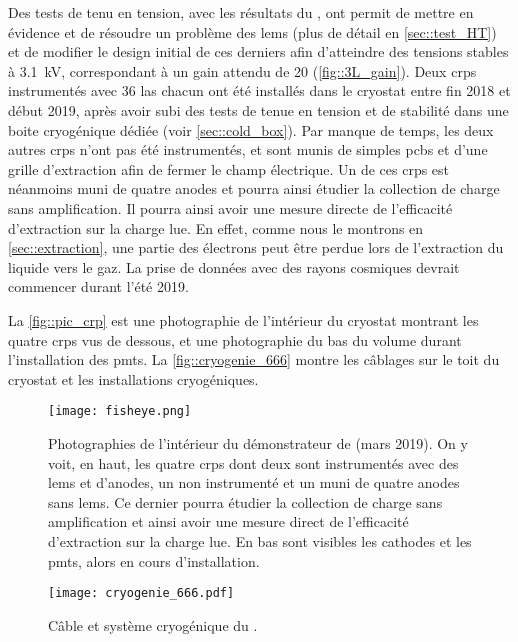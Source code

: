       Des tests de tenu en tension, avec les résultats du \TOO{}, ont permit de mettre en évidence et de résoudre un problème des \glspl{lem} (plus de détail en \autoref{sec::test_HT}) et de modifier le design initial de ces derniers afin d'atteindre des tensions stables à \SI{3.1}{\kilo\volt}, correspondant à un gain attendu de 20 (\autoref{fig::3L_gain}). Deux \glspl{crp} instrumentés avec 36 \gls{las} chacun ont été installés dans le cryostat entre fin 2018 et début 2019, après avoir subi des tests de tenue en tension et de stabilité dans une boite cryogénique dédiée (voir \autoref{sec::cold_box}). Par manque de temps, les deux autres \glspl{crp} n'ont pas été instrumentés, et sont munis de simples \glspl{pcb} et d'une grille d'extraction afin de fermer le champ électrique. Un de ces \glspl{crp} est néanmoins muni de quatre anodes et pourra ainsi étudier la collection de charge sans amplification. Il pourra ainsi avoir une mesure directe de l'efficacité d'extraction sur la charge lue. En effet, comme nous le montrons en \autoref{sec::extraction}, une partie des électrons peut être perdue lors de l'extraction du liquide vers le gaz. La prise de données avec des rayons cosmiques devrait commencer durant l'été 2019. 

      La \autoref{fig::pic_crp} est une photographie de l'intérieur du cryostat montrant les quatre \glspl{crp} vus de dessous, et une photographie du bas du volume durant l'installation des \glspl{pmt}. La \autoref{fig::cryogenie_666} montre les câblages sur le toit du cryostat et les installations cryogéniques.


      \begin{figure}[!htb]
        \centering
        \texttt{[image: fisheye.png]}        
        \caption[Photographie de l'intétrieur du démonstrateur de \SSS{}]{\label{fig::pic_crp}Photographies de l'intérieur du démonstrateur de \SSS{} (mars 2019). On y voit, en haut, les quatre \glspl{crp} dont deux sont instrumentés avec des \glspl{lem} et d'anodes, un non instrumenté et un muni de quatre anodes sans \glspl{lem}. Ce dernier pourra étudier la collection de charge sans amplification et ainsi avoir une mesure direct de l'efficacité d'extraction sur la charge lue. En bas sont visibles les cathodes et les \glspl{pmt}, alors en cours d'installation.}
      \end{figure}
      
      \begin{figure}[!htb]
        \centering
        \texttt{[image: cryogenie\_666.pdf]}
        \caption[Câble et système cryogénique du \SSS{}]{\label{fig::cryogenie_666}Câble et système cryogénique du \SSS{}.}
      \end{figure}

